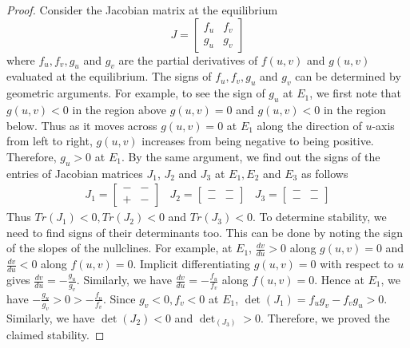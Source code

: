\documentclass{aims}
\theoremstyle{definition}
\begin{document}
\begin{proof}
Consider the Jacobian matrix at the equilibrium 
\[
J=\begin{bmatrix}
f_u & f_v\\
g_u & g_v
\end{bmatrix}
\]
where $f_{u},f_{v},g_{u}$ and $g_{v}$ are the partial derivatives of $f(u,v)$ and $g(u,v)$ evaluated at the equilibrium. The signs of $f_{u},f_{v},g_{u}$ and $g_{v}$ can be determined by geometric arguments. For example, to see the sign of $g_{u}$ at $E_1$, we first note that $g(u,v)<0$ in the region above $g(u,v)=0$ and $g(u,v)<0$ in the region below. Thus as it moves across $g(u,v)=0$ at $E_1$ along the direction of $u$-axis from left to right, $g(u,v)$ increases from being negative to being positive. Therefore, $g_u>0$ at $E_1$. By the same argument, we find out the signs of the entries of Jacobian matrices $J_1$, $J_2$ and $J_3$ at $E_1,E_2$ and $E_3$ as follows
\begin{eqnarray} \label{eq:J}
J_{1}=\begin{bmatrix}- & -\\
+ & -
\end{bmatrix} & J_{2}=\begin{bmatrix}- & -\\
- & -
\end{bmatrix} & J_{3}=\begin{bmatrix}- & -\\
- & -
\end{bmatrix}
\end{eqnarray}
Thus $Tr(J_1)<0, Tr(J_2)<0$ and $Tr(J_3)<0$. To determine stability, we need to find signs of their determinants too. This can be done by noting the sign of the slopes of the nullclines. For example, at $E_1$, $\frac{dv}{du}>0$ along $g(u,v)=0$ and $\frac{dv}{du}<0$ along $f(u,v)=0$. Implicit differentiating $g(u,v)=0$ with respect to $u$ gives $\frac{dv}{du}=-\frac{g_u}{g_v}$. Similarly, we have $\frac{dv}{du}=-\frac{f_u}{f_v}$ along $f(u,v)=0$. Hence at $E_1$, we have $-\frac{g_u}{g_v}>0>-\frac{f_u}{f_v}$. Since $g_v<0,f_v<0$ at $E_1$, $\det(J_1)=f_u g_v - f_v g_u>0$. Similarly, we have $\det(J_2)<0$ and $\det_(J_3)>0$. Therefore, we proved the claimed stability.      
\end{proof}
\end{document}
